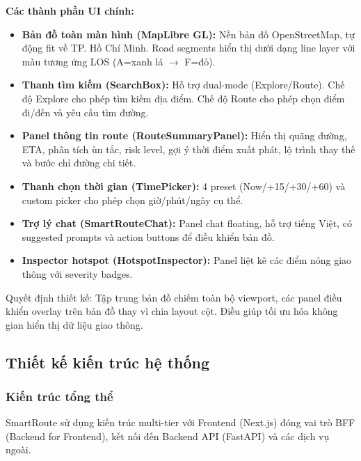 \documentclass[12pt,a4paper]{article}
\begin{document}
\textbf{Các thành phần UI chính:}
\begin{itemize}[leftmargin=1.2cm]
    \item \textbf{Bản đồ toàn màn hình (MapLibre GL):} Nền bản đồ OpenStreetMap, tự động fit về TP. Hồ Chí Minh. Road segments hiển thị dưới dạng line layer với màu tương ứng LOS (A=xanh lá $\rightarrow$ F=đỏ).
    \item \textbf{Thanh tìm kiếm (SearchBox):} Hỗ trợ dual-mode (Explore/Route). Chế độ Explore cho phép tìm kiếm địa điểm. Chế độ Route cho phép chọn điểm đi/đến và yêu cầu tìm đường.
    \item \textbf{Panel thông tin route (RouteSummaryPanel):} Hiển thị quãng đường, ETA, phân tích ùn tắc, risk level, gợi ý thời điểm xuất phát, lộ trình thay thế và bước chỉ đường chi tiết.
    \item \textbf{Thanh chọn thời gian (TimePicker):} 4 preset (Now/+15/+30/+60) và custom picker cho phép chọn giờ/phút/ngày cụ thể.
    \item \textbf{Trợ lý chat (SmartRouteChat):} Panel chat floating, hỗ trợ tiếng Việt, có suggested prompts và action buttons để điều khiển bản đồ.
    \item \textbf{Inspector hotspot (HotspotInspector):} Panel liệt kê các điểm nóng giao thông với severity badges.
\end{itemize}

Quyết định thiết kế: Tập trung bản đồ chiếm toàn bộ viewport, các panel điều khiển overlay trên bản đồ thay vì chia layout cột. Điều giúp tối ưu hóa không gian hiển thị dữ liệu giao thông.

\subsection{Thiết kế kiến trúc hệ thống}

\subsubsection{Kiến trúc tổng thể}
SmartRoute sử dụng kiến trúc multi-tier với Frontend (Next.js) đóng vai trò BFF (Backend for Frontend), kết nối đến Backend API (FastAPI) và các dịch vụ ngoài.
\end{document}
